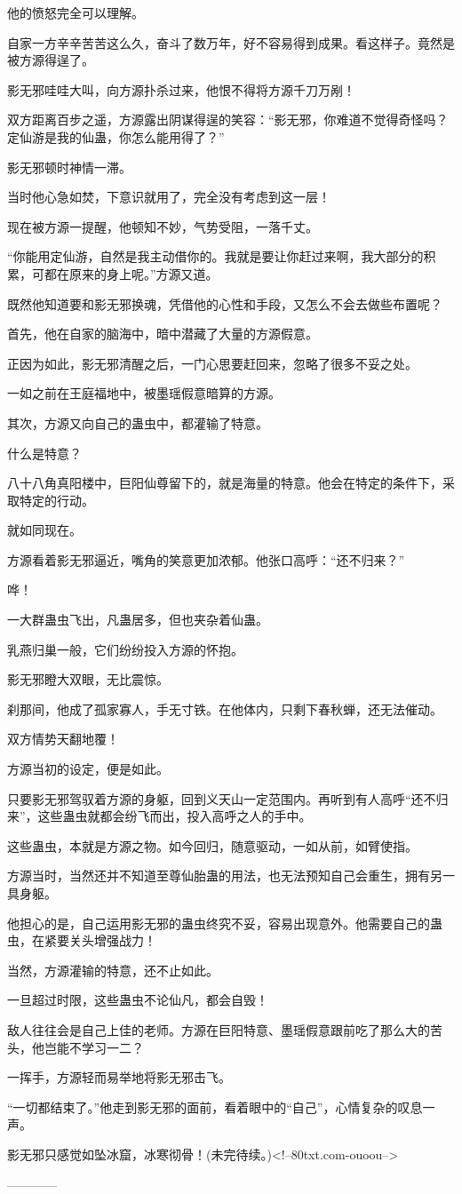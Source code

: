\begin{this_body}
他的愤怒完全可以理解。

自家一方辛辛苦苦这么久，奋斗了数万年，好不容易得到成果。看这样子。竟然是被方源得逞了。

影无邪哇哇大叫，向方源扑杀过来，他恨不得将方源千刀万剐！

双方距离百步之遥，方源露出阴谋得逞的笑容：“影无邪，你难道不觉得奇怪吗？定仙游是我的仙蛊，你怎么能用得了？”

影无邪顿时神情一滞。

当时他心急如焚，下意识就用了，完全没有考虑到这一层！

现在被方源一提醒，他顿知不妙，气势受阻，一落千丈。

“你能用定仙游，自然是我主动借你的。我就是要让你赶过来啊，我大部分的积累，可都在原来的身上呢。”方源又道。

既然他知道要和影无邪换魂，凭借他的心性和手段，又怎么不会去做些布置呢？

首先，他在自家的脑海中，暗中潜藏了大量的方源假意。

正因为如此，影无邪清醒之后，一门心思要赶回来，忽略了很多不妥之处。

一如之前在王庭福地中，被墨瑶假意暗算的方源。

其次，方源又向自己的蛊虫中，都灌输了特意。

什么是特意？

八十八角真阳楼中，巨阳仙尊留下的，就是海量的特意。他会在特定的条件下，采取特定的行动。

就如同现在。

方源看着影无邪逼近，嘴角的笑意更加浓郁。他张口高呼：“还不归来？”

哗！

一大群蛊虫飞出，凡蛊居多，但也夹杂着仙蛊。

乳燕归巢一般，它们纷纷投入方源的怀抱。

影无邪瞪大双眼，无比震惊。

刹那间，他成了孤家寡人，手无寸铁。在他体内，只剩下春秋蝉，还无法催动。

双方情势天翻地覆！

方源当初的设定，便是如此。

只要影无邪驾驭着方源的身躯，回到义天山一定范围内。再听到有人高呼“还不归来”，这些蛊虫就都会纷飞而出，投入高呼之人的手中。

这些蛊虫，本就是方源之物。如今回归，随意驱动，一如从前，如臂使指。

方源当时，当然还并不知道至尊仙胎蛊的用法，也无法预知自己会重生，拥有另一具身躯。

他担心的是，自己运用影无邪的蛊虫终究不妥，容易出现意外。他需要自己的蛊虫，在紧要关头增强战力！

当然，方源灌输的特意，还不止如此。

一旦超过时限，这些蛊虫不论仙凡，都会自毁！

敌人往往会是自己上佳的老师。方源在巨阳特意、墨瑶假意跟前吃了那么大的苦头，他岂能不学习一二？

一挥手，方源轻而易举地将影无邪击飞。

“一切都结束了。”他走到影无邪的面前，看着眼中的“自己”，心情复杂的叹息一声。

影无邪只感觉如坠冰窟，冰寒彻骨！(未完待续。)<!--80txt.com-ouoou-->

------------

\end{this_body}

